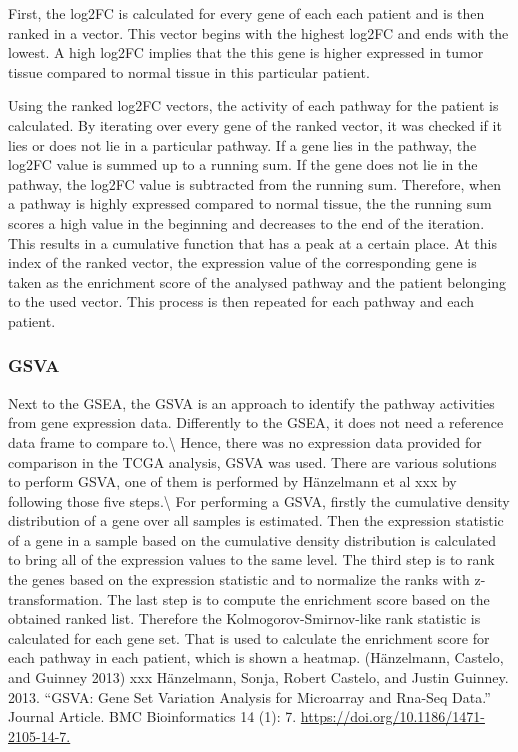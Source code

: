 \documentclass[
]{article}
\begin{document}
First, the log2FC is calculated for every gene of each each patient and
is then ranked in a vector. This vector begins with the highest log2FC
and ends with the lowest. A high log2FC implies that the this gene is
higher expressed in tumor tissue compared to normal tissue in this
particular patient.

Using the ranked log2FC vectors, the activity of each pathway for the
patient is calculated. By iterating over every gene of the ranked
vector, it was checked if it lies or does not lie in a particular
pathway. If a gene lies in the pathway, the log2FC value is summed up to
a running sum. If the gene does not lie in the pathway, the log2FC value
is subtracted from the running sum. Therefore, when a pathway is highly
expressed compared to normal tissue, the the running sum scores a high
value in the beginning and decreases to the end of the iteration. This
results in a cumulative function that has a peak at a certain place. At
this index of the ranked vector, the expression value of the
corresponding gene is taken as the enrichment score of the analysed
pathway and the patient belonging to the used vector. This process is
then repeated for each pathway and each patient.

\hypertarget{gsva}{%
\subsubsection{GSVA}\label{gsva}}

Next to the GSEA, the GSVA is an approach to identify the pathway
activities from gene expression data. Differently to the GSEA, it does
not need a reference data frame to compare to.\textbackslash{} Hence,
there was no expression data provided for comparison in the TCGA
analysis, GSVA was used. There are various solutions to perform GSVA,
one of them is performed by Hänzelmann et al xxx by following those five
steps.\textbackslash{} For performing a GSVA, firstly the cumulative
density distribution of a gene over all samples is estimated. Then the
expression statistic of a gene in a sample based on the cumulative
density distribution is calculated to bring all of the expression values
to the same level. The third step is to rank the genes based on the
expression statistic and to normalize the ranks with z-transformation.
The last step is to compute the enrichment score based on the obtained
ranked list. Therefore the Kolmogorov-Smirnov-like rank statistic is
calculated for each gene set. That is used to calculate the enrichment
score for each pathway in each patient, which is shown a heatmap.
(Hänzelmann, Castelo, and Guinney 2013) xxx Hänzelmann, Sonja, Robert
Castelo, and Justin Guinney. 2013. ``GSVA: Gene Set Variation Analysis
for Microarray and Rna-Seq Data.'' Journal Article. BMC Bioinformatics
14 (1): 7. \url{https://doi.org/10.1186/1471-2105-14-7.}
\end{document}
